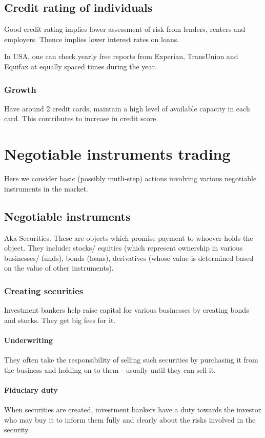 \documentclass[oneside, article]{memoir}
\begin{document}
\section{Credit rating of individuals}
Good credit rating implies lower assessment of risk from lenders, renters and employers. Thence implies lower interest rates on loans.

In USA, one can check yearly free reports from Experian, TransUnion and Equifax at equally spaced times during the year.

\subsection{Growth}
Have around 2 credit cards, maintain a high level of available capacity in each card. This contributes to increase in credit score.


\chapter{Negotiable instruments trading}
Here we consider basic (possibly mutli-step) actions involving various negotiable instruments in the market.

\section{Negotiable instruments}
Aka Securities. These are objects which promise payment to whoever holds the object. They include: stocks/ equities (which represent ownership in various businesses/ funds), bonds (loans), derivatives (whose value is determined based on the value of other instruments).

\subsection{Creating securities}
Investment bankers help raise capital for various businesses by creating bonds and stocks. They get big fees for it.

\subsubsection{Underwriting}
They often take the responsibility of selling such securities by purchasing it from the business and holding on to them - usually until they can sell it.

\subsubsection{Fiduciary duty}
When securities are created, investment bankers have a duty towards the investor who may buy it to inform them fully and clearly about the risks involved in the security.
\end{document}
